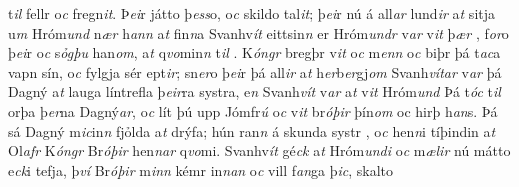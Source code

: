 t\textit{il} fellr  o\textit{c}   fregn\textit{it}. 
Þ\textit{ei}r játto þ\textit{ess}o, o\textit{c} skildo tal\textit{it};   þ\textit{ei}r nú   á all\textit{ar} lund\textit{ir} a\textit{t} sitja u\textit{m}
Hróm\textit{und} n\textit{ær} h\textit{ann}  a\textit{t} fin\textit{n}a  Svanhv\textit{ít}  eittsin\textit{n} er Hróm\textit{undr} v\textit{ar}  v\textit{it} þ\textit{ær} , f\textit{or}o  þ\textit{ei}r   
o\textit{c} s\textit{ỏgþu} han\textit{om}, a\textit{t}  q\textit{vo}min\textit{n} t\textit{il} . 
K\textit{óngr} bregþr   v\textit{it} o\textit{c}  m\textit{enn} o\textit{c} biþr þá  t\textit{ac}a vapn sín,
o\textit{c} fylgja sér ept\textit{ir}; sn\textit{er}o þ\textit{ei}r þá
all\textit{ir} a\textit{t} h\textit{er}b\textit{er}gj\textit{om}
Svanh\textit{vítar} v\textit{ar} þá Dagný a\textit{t}  lauga  líntrefla þ\textit{eir}ra systra, e\textit{n} Svanh\textit{vít} v\textit{ar} a\textit{t}  v\textit{it} Hróm\textit{und} Þá t\textit{óc} t\textit{il} orþa  þ\textit{er}na  Dagný\textit{ar}, o\textit{c}  lít þú upp Jómfr\textit{ú} o\textit{c}  v\textit{it} br\textit{óþir} þín\textit{om} oc  hirþ
h\textit{an}s. Þá sá Dagný m\textit{ic}in\textit{n} fjỏlda a\textit{t}
drýfa; hún  ran\textit{n} á skunda   systr  , o\textit{c}  hen\textit{n}i tíþindin a\textit{t} Ol\textit{afr} K\textit{óngr} Br\textit{óþir} hen\textit{n}\textit{ar}
q\textit{vo}mi. Svanhv\textit{ít} gé\textit{ck} a\textit{t}
Hróm\textit{undi} o\textit{c} m\textit{ælir} nú mátto
e\textit{ck}i  tefja, þ\textit{ví} Br\textit{óþir} m\textit{inn} kémr in\textit{n}\textit{an}  o\textit{c} vill  f\textit{an}ga þ\textit{ic}, skalto
